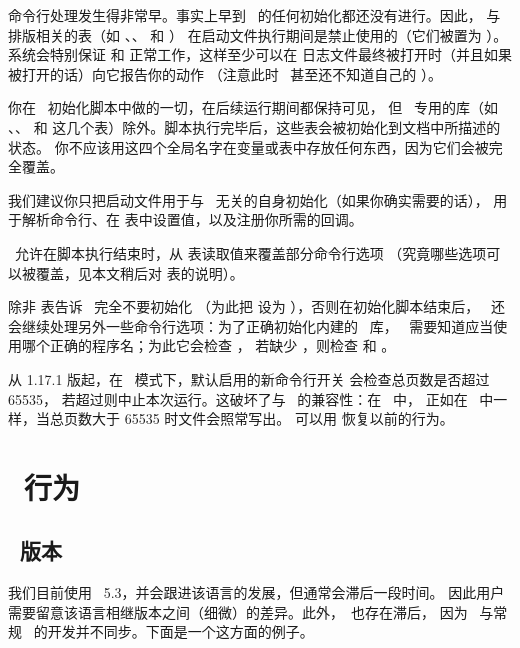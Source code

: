 命令行处理发生得非常早。事实上早到 \TEX\ 的任何初始化都还没有进行。因此，
与排版相关的表（如 、、 和 ）
在启动文件执行期间是禁止使用的（它们被置为 ）。系统会特别保证
 和  正常工作，这样至少可以在
日志文件最终被打开时（并且如果被打开的话）向它报告你的动作
（注意此时 \TEX\ 甚至还不知道自己的 ）。

你在 \LUA\ 初始化脚本中做的一切，在后续运行期间都保持可见，
但 \TEX\ 专用的库（如 、、 和 
这几个表）除外。脚本执行完毕后，这些表会被初始化到文档中所描述的状态。
你不应该用这四个全局名字在变量或表中存放任何东西，因为它们会被完全覆盖。

我们建议你只把启动文件用于与 \TEX\ 无关的自身初始化（如果你确实需要的话），
用于解析命令行、在  表中设置值，以及注册你所需的回调。

\LUATEX\ 允许在脚本执行结束时，从  表读取值来覆盖部分命令行选项
（究竟哪些选项可以被覆盖，见本文稍后对  表的说明）。

除非  表告诉 \LUATEX\ 完全不要初始化 \KPATHSEA
（为此把  设为 ），否则在初始化脚本结束后，
\LUATEX\ 还会继续处理另外一些命令行选项：为了正确初始化内建的 \KPATHSEA\ 库，
\LUATEX\ 需要知道应当使用哪个正确的程序名；为此它会检查 ，
若缺少 ，则检查  和 。

从 1.17.1 版起，在 \DVI\ 模式下，默认启用的新命令行开关
 会检查总页数是否超过 65535，
若超过则中止本次运行。这破坏了与 \PDFTEX\ 的兼容性：在 \PDFTEX\ 中，
正如在 \TEX\ 中一样，当总页数大于 65535 时文件会照常写出。
可以用  恢复以前的行为。

\section{\LUA\ 行为}

\subsection{\LUA\ 版本}


我们目前使用 \LUA\ 5.3，并会跟进该语言的发展，但通常会滞后一段时间。
因此用户需要留意该语言相继版本之间（细微）的差异。此外，\LUAJITTEX\ 也存在滞后，
因为 \LUAJIT\ 与常规 \LUA\ 的开发并不同步。下面是一个这方面的例子。

